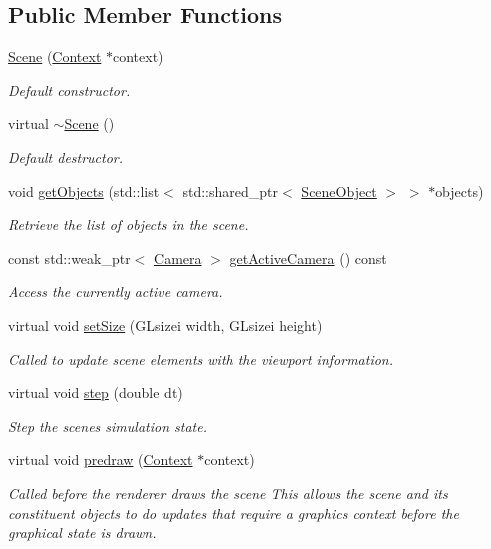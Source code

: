 \subsection*{Public Member Functions}
\begin{DoxyCompactItemize}
\item 
\hyperlink{class_scene_ae40169557308d8af0bd57d3f814b1937}{Scene} (\hyperlink{class_context}{Context} $\ast$context)
\begin{DoxyCompactList}\small\item\em Default constructor. \end{DoxyCompactList}\item 
virtual \hyperlink{class_scene_a3b8cec2e32546713915f8c6303c951f1}{$\sim$\+Scene} ()
\begin{DoxyCompactList}\small\item\em Default destructor. \end{DoxyCompactList}\item 
void \hyperlink{class_scene_af0990031fb81e2bec0391a5923911fc3}{get\+Objects} (std\+::list$<$ std\+::shared\+\_\+ptr$<$ \hyperlink{class_scene_object}{Scene\+Object} $>$ $>$ $\ast$objects)
\begin{DoxyCompactList}\small\item\em Retrieve the list of objects in the scene. \end{DoxyCompactList}\item 
const std\+::weak\+\_\+ptr$<$ \hyperlink{class_camera}{Camera} $>$ \hyperlink{class_scene_a314aabca592a5979069563b0845bac2f}{get\+Active\+Camera} () const 
\begin{DoxyCompactList}\small\item\em Access the currently active camera. \end{DoxyCompactList}\item 
virtual void \hyperlink{class_scene_adc13fd7e44ebc5cb6165cb25853420c7}{set\+Size} (G\+Lsizei width, G\+Lsizei height)
\begin{DoxyCompactList}\small\item\em Called to update scene elements with the viewport information. \end{DoxyCompactList}\item 
virtual void \hyperlink{class_scene_aa9597b193a1cd70a276ca2480c01adea}{step} (double dt)
\begin{DoxyCompactList}\small\item\em Step the scene\textquotesingle{}s simulation state. \end{DoxyCompactList}\item 
virtual void \hyperlink{class_scene_a5c993df1c224d17fc3fd618d413e3f87}{predraw} (\hyperlink{class_context}{Context} $\ast$context)
\begin{DoxyCompactList}\small\item\em Called before the renderer draws the scene This allows the scene and its constituent objects to do updates that require a graphics context before the graphical state is drawn. \end{DoxyCompactList}\end{DoxyCompactItemize}
